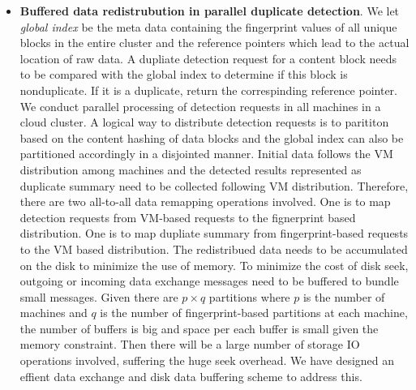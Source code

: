\begin{itemize}
\item {\bf Buffered data redistrubution in parallel duplicate detection}.  
We let {\em global index} be the meta data containing the fingerprint values of all unique blocks
in the entire cluster and  the reference pointers which lead to the actual location of raw data.
A dupliate detection request for a content block needs to be compared with the global index to determine if this
block is nonduplicate. If it is a duplicate, return the correspinding reference pointer.
We conduct parallel processing of detection requests in all machines in a cloud cluster.
A logical way to distribute detection requests is to parititon based on the content  hashing of data blocks
and the global index can also be partitioned accordingly in a  disjointed manner.
Initial data follows the VM distribution among machines and the detected results 
represented as  duplicate summary need to be collected following VM distribution. 
Therefore, there are two all-to-all data remapping operations involved.
One is to map detection requests from VM-based requests to the fignerprint based distribution.  
One is to map dupliate summary from fingerprint-based requests to the VM based distribution.  
The redistribued data needs to be accumulated on the disk to minimize the use of memory.
To minimize the cost of disk seek, outgoing or incoming data exchange messages need to be buffered to bundle small messages.
Given there are $p\times q$ partitions where $p$ is the number of machines and $q$ is the number of fingerprint-based partitions
at each machine, the number of buffers is big and space per each buffer  is small given the memory constraint.
Then there will be a large number of storage  IO operations involved, suffering the huge seek overhead.
We have designed an effient data exchange and disk data buffering  scheme to address this.


\end{itemize}


